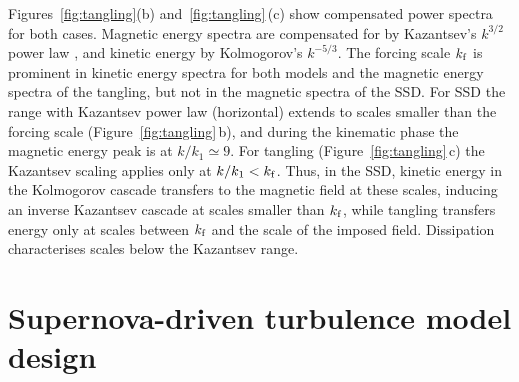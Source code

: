 \documentclass[preprint2]{aastex63}
\newcommand\kf{k_{\rm f} }
\newcommand{\fg}[1]{\textcolor{midgreen}{#1}}
\newcommand{\mm}[1]{\textcolor{mypurple}{#1}}
\begin{document}
 \mm{Figures~\ref{fig:tangling}(b) and~\ref{fig:tangling}\,(c) show
   compensated power spectra for both cases.}
 Magnetic energy spectra are compensated \mm{for by} Kazantsev's $k^{3/2}$
 \fg{power law} \citep{Sch02,BS14}, and kinetic energy \mm{by}
 Kolmogorov's $k^{-5/3}$.
 The forcing scale $\kf$ is
 \mm{prominent} in kinetic
 energy \fg{spectra for both models} and the magnetic energy \fg{spectra of
 the tangling}, but \mm{not}
 \fg{in the magnetic spectra of the SSD}.
 \fg{For SSD the range with Kazantsev power law (horizontal) extends to scales
 smaller than the forcing scale (Figure~\ref{fig:tangling}\,b), and during the
 kinematic phase the magnetic energy peak is at $k/k_1\simeq9$.}
\fg{For tangling (Figure~\ref{fig:tangling}\,c) the Kazantsev
  \mm{scaling} applies
only at $k/k_1<\kf$.} 
Thus, in the SSD, kinetic energy
     \mm{in the Kolmogorov cascade}
transfers to the magnetic field at these scales, inducing an inverse Kazantsev \fg{cascade}
 at scales \fg{smaller than} $\kf$, while tangling transfers energy only at
 scales between
 $\kf$ and the scale of the imposed field.
 Dissipation \fg{characterises} scales below the Kazantsev range.
 
\section{\mm{Supernova-driven} turbulence model design} \label{sec:model}
\end{document}
